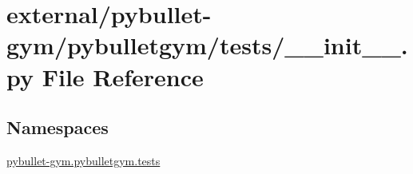 \hypertarget{external_2pybullet-gym_2pybulletgym_2tests_2____init_____8py}{}\section{external/pybullet-\/gym/pybulletgym/tests/\+\_\+\+\_\+init\+\_\+\+\_\+.py File Reference}
\label{external_2pybullet-gym_2pybulletgym_2tests_2____init_____8py}
\subsection*{Namespaces}
\begin{DoxyCompactItemize}
\item 
 \hyperlink{namespacepybullet-gym_1_1pybulletgym_1_1tests}{pybullet-\/gym.\+pybulletgym.\+tests}
\end{DoxyCompactItemize}
